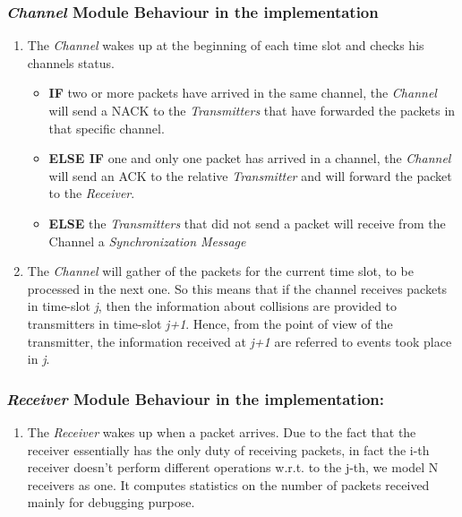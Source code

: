\subsubsection{\textit{Channel} Module Behaviour in the implementation}
\begin{enumerate}
	\item The \textit{Channel} wakes up at the beginning of each time slot and checks his channels status.
	\begin{itemize}
		\item \textbf{IF} two or more packets have arrived in the same channel, the \textit{Channel} will send a NACK to the \textit{Transmitters} that have forwarded the packets in that specific channel.
		\item \textbf{ELSE IF} one and only one packet has arrived in a channel, the \textit{Channel} will send an ACK to the relative \textit{Transmitter} and will forward the packet to the \textit{Receiver}.
		\item \textbf{ELSE} the \textit{Transmitters} that did not send a packet will receive from the Channel a \textit{Synchronization Message}
	\end{itemize}
	\item The \textit{Channel} will gather of the packets for the current time slot, to be processed in the next one. So this means that if the channel receives packets in time-slot \emph{j}, then the information about collisions are provided to transmitters in time-slot \emph{j+1}. Hence, from the point of view of the transmitter, the information received at \emph{j+1} are referred to events took place in \emph{j}.
\end{enumerate}
\subsubsection{\textit{Receiver} Module Behaviour in the implementation:}
\begin{enumerate}
	\item The \textit{Receiver} wakes up when a packet arrives. Due to the fact that the receiver essentially has the only duty of receiving packets, in fact the i-th receiver doesn't perform different operations w.r.t. to the j-th, we model N receivers as one. It computes statistics on the number of packets received mainly for debugging purpose.
\end{enumerate}